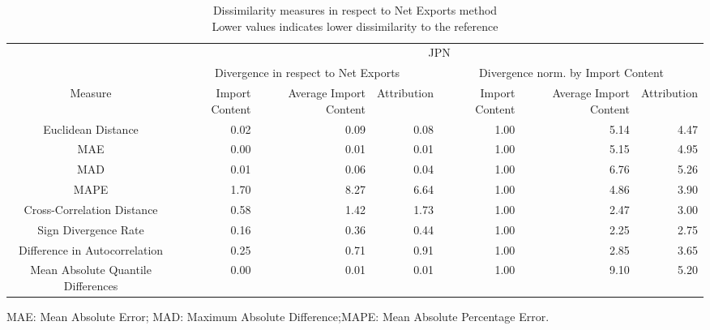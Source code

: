 \begin{table}[t]
\caption*{
{\large Dissimilarity measures in respect to Net Exports method} \\ 
{\small Lower values indicates lower dissimilarity to the reference}
} 
\fontsize{15.0pt}{18.0pt}\selectfont
\begin{tabular*}{\linewidth}{@{\extracolsep{\fill}}crrrrrr}
\toprule
 & \multicolumn{6}{c}{JPN} \\ 
\cmidrule(lr){2-7}
 & \multicolumn{3}{c}{Divergence in respect to Net Exports} & \multicolumn{3}{c}{Divergence norm. by Import Content} \\ 
\cmidrule(lr){2-4} \cmidrule(lr){5-7}
Measure & Import Content & Average Import Content & Attribution & Import Content & Average Import Content & Attribution \\ 
\midrule\addlinespace[2.5pt]
Euclidean Distance & 0.02 & 0.09 & 0.08 & 1.00 & 5.14 & 4.47 \\ 
MAE & 0.00 & 0.01 & 0.01 & 1.00 & 5.15 & 4.95 \\ 
MAD & 0.01 & 0.06 & 0.04 & 1.00 & 6.76 & 5.26 \\ 
MAPE & 1.70 & 8.27 & 6.64 & 1.00 & 4.86 & 3.90 \\ 
Cross-Correlation Distance & 0.58 & 1.42 & 1.73 & 1.00 & 2.47 & 3.00 \\ 
Sign Divergence Rate & 0.16 & 0.36 & 0.44 & 1.00 & 2.25 & 2.75 \\ 
Difference in Autocorrelation & 0.25 & 0.71 & 0.91 & 1.00 & 2.85 & 3.65 \\ 
Mean Absolute Quantile Differences & 0.00 & 0.01 & 0.01 & 1.00 & 9.10 & 5.20 \\ 
\bottomrule
\end{tabular*}
\begin{minipage}{\linewidth}
MAE: Mean Absolute Error; MAD: Maximum Absolute Difference;MAPE: Mean Absolute Percentage Error.\\
\end{minipage}
\end{table}

